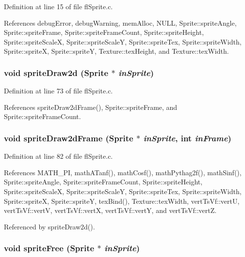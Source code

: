 Definition at line 15 of file fl\-Sprite.c.

References debug\-Error, debug\-Warning, mem\-Alloc, NULL, Sprite::sprite\-Angle, Sprite::sprite\-Frame, Sprite::sprite\-Frame\-Count, Sprite::sprite\-Height, Sprite::sprite\-Scale\-X, Sprite::sprite\-Scale\-Y, Sprite::sprite\-Tex, Sprite::sprite\-Width, Sprite::sprite\-X, Sprite::sprite\-Y, Texture::tex\-Height, and Texture::tex\-Width.
\subsubsection{\setlength{\rightskip}{0pt plus 5cm}void sprite\-Draw2d ({\bf Sprite} $\ast$ {\em in\-Sprite})}\label{flSprite_8h_ba260da216330964da593c7a6ad9ab51}




Definition at line 73 of file fl\-Sprite.c.

References sprite\-Draw2d\-Frame(), Sprite::sprite\-Frame, and Sprite::sprite\-Frame\-Count.
\subsubsection{\setlength{\rightskip}{0pt plus 5cm}void sprite\-Draw2d\-Frame ({\bf Sprite} $\ast$ {\em in\-Sprite}, int {\em in\-Frame})}\label{flSprite_8h_c34d1e4b449c227734bfa340f470d4f1}




Definition at line 82 of file fl\-Sprite.c.

References MATH\_\-PI, math\-ATanf(), math\-Cosf(), math\-Pythag2f(), math\-Sinf(), Sprite::sprite\-Angle, Sprite::sprite\-Frame\-Count, Sprite::sprite\-Height, Sprite::sprite\-Scale\-X, Sprite::sprite\-Scale\-Y, Sprite::sprite\-Tex, Sprite::sprite\-Width, Sprite::sprite\-X, Sprite::sprite\-Y, tex\-Bind(), Texture::tex\-Width, vert\-Ts\-Vf::vert\-U, vert\-Ts\-Vf::vert\-V, vert\-Ts\-Vf::vert\-X, vert\-Ts\-Vf::vert\-Y, and vert\-Ts\-Vf::vert\-Z.

Referenced by sprite\-Draw2d().
\subsubsection{\setlength{\rightskip}{0pt plus 5cm}void sprite\-Free ({\bf Sprite} $\ast$ {\em in\-Sprite})}\label{flSprite_8h_ba10606746e61c0fb83f4d128ebe1c57}




